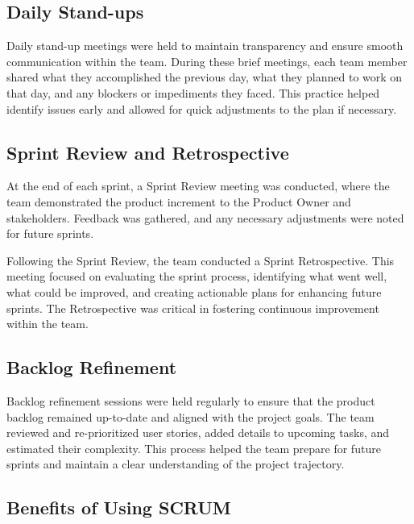 \documentclass[a4paper,12pt,twoside]{ThesisStyle}
\begin{document}
\subsection{Daily Stand-ups}

Daily stand-up meetings were held to maintain transparency and ensure smooth communication within the team. During these brief meetings, each team member shared what they accomplished the previous day, what they planned to work on that day, and any blockers or impediments they faced. This practice helped identify issues early and allowed for quick adjustments to the plan if necessary.

\subsection{Sprint Review and Retrospective}

At the end of each sprint, a Sprint Review meeting was conducted, where the team demonstrated the product increment to the Product Owner and stakeholders. Feedback was gathered, and any necessary adjustments were noted for future sprints.

Following the Sprint Review, the team conducted a Sprint Retrospective. This meeting focused on evaluating the sprint process, identifying what went well, what could be improved, and creating actionable plans for enhancing future sprints. The Retrospective was critical in fostering continuous improvement within the team.

\subsection{Backlog Refinement}

Backlog refinement sessions were held regularly to ensure that the product backlog remained up-to-date and aligned with the project goals. The team reviewed and re-prioritized user stories, added details to upcoming tasks, and estimated their complexity. This process helped the team prepare for future sprints and maintain a clear understanding of the project trajectory.

\subsection{Benefits of Using SCRUM}
\end{document}
